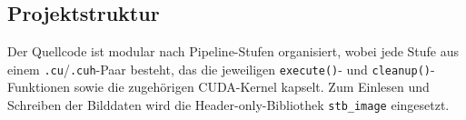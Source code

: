 \subsection{Projektstruktur}
\label{subsec:projektstruktur}

\begin{center}
    \begin{minipage}[t]{0.45\textwidth}
        \small
        Der Quellcode ist modular nach Pipeline-Stufen organisiert,
        wobei jede Stufe aus einem \texttt{.cu}/\texttt{.cuh}-Paar
        besteht, das die jeweiligen \texttt{execute()}- und
        \texttt{cleanup()}-Funktionen sowie die zugehörigen
        CUDA-Kernel kapselt. Zum Einlesen und Schreiben der Bilddaten
        wird die Header-only-Bibliothek \texttt{stb\_image} eingesetzt.
    \end{minipage}
    \hfill
    \begin{minipage}[t]{0.45\textwidth}
        \small
    \end{minipage}
\end{center}